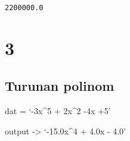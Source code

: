 \documentclass[11pt]{article}
\makeatletter
\newcommand{\boxspacing}{\kern\kvtcb@left@rule\kern\kvtcb@boxsep}
\newcommand{\prompt}[4]{
        {\ttfamily\llap{{\color{#2}[#3]:\hspace{3pt}#4}}\vspace{-\baselineskip}}
    }
\makeatother
\begin{document}
            \begin{tcolorbox}[breakable, size=fbox, boxrule=.5pt, pad at break*=1mm, opacityfill=0]
\prompt{Out}{outcolor}{15}{\boxspacing}
\begin{Verbatim}[commandchars=\\\{\}]
2200000.0
\end{Verbatim}
\end{tcolorbox}
        
    \hypertarget{section}{%
\section{3}\label{section}}

\hypertarget{turunan-polinom}{%
\subsection{Turunan polinom}\label{turunan-polinom}}

dat = `-3x\^{}5 + 2x\^{}2 -4x +5'

output -\textgreater{} `-15.0x\^{}4 + 4.0x - 4.0'
\end{document}
